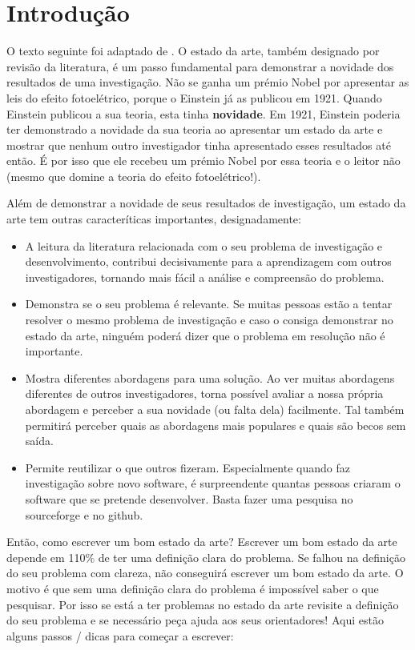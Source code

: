 \section{Introdução}
O texto seguinte foi adaptado de \cite{Babak2017}.
O estado da arte, também designado por revisão da literatura, é um passo fundamental para demonstrar a novidade dos resultados de uma investigação. Não se ganha um prémio Nobel por apresentar as leis do efeito fotoelétrico, porque o Einstein já as publicou em 1921. Quando Einstein publicou a sua teoria, esta tinha \textbf{novidade}. Em 1921, Einstein poderia ter demonstrado a novidade da sua teoria ao apresentar um estado da arte e mostrar que nenhum outro investigador tinha apresentado esses resultados até então. É por isso que ele recebeu um prémio Nobel por essa teoria e o leitor não (mesmo que domine a teoria do efeito fotoelétrico!).

Além de demonstrar a novidade de seus resultados de investigação, um estado da arte tem outras caracteríticas importantes, designadamente:
\begin{itemize}
  \item A leitura da literatura relacionada com o seu problema de investigação e desenvolvimento, contribui decisivamente para a aprendizagem com outros investigadores, tornando mais fácil a análise e compreensão do problema.
  \item Demonstra se o seu problema é relevante. Se muitas pessoas estão a tentar resolver o mesmo problema de investigação e caso o consiga demonstrar no estado da arte, ninguém poderá dizer que o problema em resolução não é importante.
  \item Mostra diferentes abordagens para uma solução. Ao ver muitas abordagens diferentes de outros investigadores, torna possível avaliar a nossa própria abordagem e perceber a sua novidade (ou falta dela) facilmente. Tal também permitirá perceber quais as abordagens mais populares e quais são becos sem saída.
  \item Permite reutilizar o que outros fizeram. Especialmente quando faz investigação sobre novo software, é surpreendente quantas pessoas criaram o software que se pretende desenvolver. Basta fazer uma pesquisa no sourceforge e no github.
\end{itemize}

Então, como escrever um bom estado da arte? Escrever um bom estado da arte depende em 110\% de ter uma definição clara do problema. Se falhou na definição do seu problema com clareza, não conseguirá escrever um bom estado da arte. O motivo é que sem uma definição clara do problema é impossível saber o que pesquisar. Por isso se está a ter problemas no estado da arte revisite a definição do seu problema e se necessário peça ajuda aos seus orientadores! Aqui estão alguns passos / dicas para começar a escrever:


